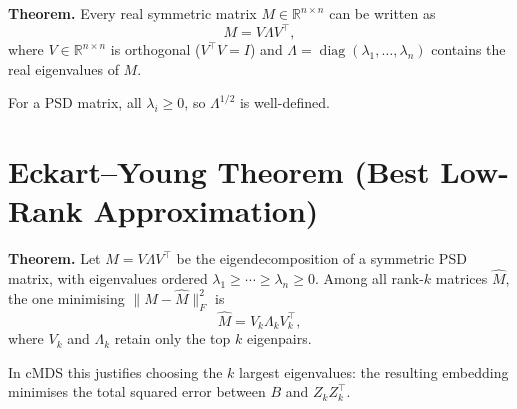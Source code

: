 \documentclass[11pt]{article}
\begin{document}
\textbf{Theorem.}  Every real symmetric matrix $M \in \mathbb{R}^{n\times
n}$ can be written as
\[
  M = V \Lambda V^{\top},
\]
where $V \in \mathbb{R}^{n\times n}$ is orthogonal ($V^{\top}V = I$) and
$\Lambda = \operatorname{diag}(\lambda_1,\dots,\lambda_n)$ contains the
real eigenvalues of $M$.

For a PSD matrix, all $\lambda_i \ge 0$, so $\Lambda^{1/2}$ is
well-defined.

\section{Eckart–Young Theorem (Best Low-Rank Approximation)}

\textbf{Theorem.}  Let $M = V\Lambda V^{\top}$ be the eigendecomposition
of a symmetric PSD matrix, with eigenvalues ordered $\lambda_1 \ge \cdots
\ge \lambda_n \ge 0$.  Among all rank-$k$ matrices $\hat{M}$, the one
minimising $\|M - \hat{M}\|_F^2$ is
\[
  \hat{M} = V_k \Lambda_k V_k^{\top},
\]
where $V_k$ and $\Lambda_k$ retain only the top $k$ eigenpairs.

In cMDS this justifies choosing the $k$ largest eigenvalues: the resulting
embedding minimises the total squared error between $B$ and $Z_kZ_k^{\top}$.
\end{document}
